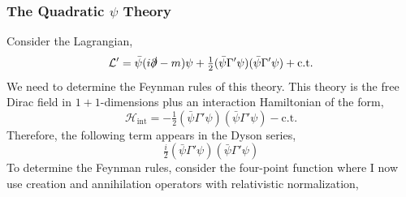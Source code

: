 \documentclass[12pt]{article}
\newcommand{\lagrange}{\mathcal{L}}
\begin{document}
\subsubsection{The Quadratic $\psi$ Theory}

Consider the Lagrangian,
\[ \lagrange' = \bar{\psi} (i \slashed{\partial} - m) \psi + \tfrac{1}{2} ( \bar{\psi} \Gamma' \psi) (\bar{\psi} \Gamma' \psi) + \mathrm{ c.t. } \]
We need to determine the Feynman rules of this theory. This theory is the free Dirac field in $1 + 1$-dimensions plus an interaction Hamiltonian of the form,
\[ \mathcal{H}_{\mathrm{int}} = - \tfrac{1}{2} ( \bar{\psi} \Gamma' \psi) (\bar{\psi} \Gamma' \psi) - \mathrm{ c.t. } \]
Therefore, the following term appears in the Dyson series,
\[ \tfrac{i}{2} ( \bar{\psi} \Gamma' \psi) (\bar{\psi} \Gamma' \psi) \]
To determine the Feynman rules, consider the four-point function where I now use creation and annihilation operators with relativistic normalization, 
\end{document}
